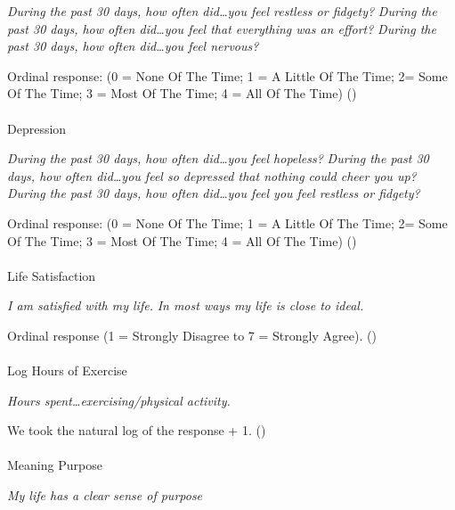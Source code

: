 \documentclass[
  single column]{article}
\makeatletter
\let\oldparagraph\paragraph
\renewcommand{\paragraph}{
    \@ifstar
      \xxxParagraphStar
      \xxxParagraphNoStar
  }
\newcommand{\xxxParagraphStar}[1]{\oldparagraph*{#1}\mbox{}}
\newcommand{\xxxParagraphNoStar}[1]{\oldparagraph{#1}\mbox{}}
\makeatother
\begin{document}
\emph{During the past 30 days, how often did\ldots you feel restless or
fidgety?} \emph{During the past 30 days, how often did\ldots you feel
that everything was an effort?} \emph{During the past 30 days, how often
did\ldots you feel nervous?}

Ordinal response: (0 = None Of The Time; 1 = A Little Of The Time; 2=
Some Of The Time; 3 = Most Of The Time; 4 = All Of The Time)
()

\paragraph{Depression}\label{depression}

\emph{During the past 30 days, how often did\ldots you feel hopeless?}
\emph{During the past 30 days, how often did\ldots you feel so depressed
that nothing could cheer you up?} \emph{During the past 30 days, how
often did\ldots you feel you feel restless or fidgety?}

Ordinal response: (0 = None Of The Time; 1 = A Little Of The Time; 2=
Some Of The Time; 3 = Most Of The Time; 4 = All Of The Time)
()

\paragraph{Life Satisfaction}\label{life-satisfaction}

\emph{I am satisfied with my life.} \emph{In most ways my life is close
to ideal.}

Ordinal response (1 = Strongly Disagree to 7 = Strongly Agree).
()

\paragraph{Log Hours of Exercise}\label{log-hours-of-exercise-1}

\emph{Hours spent\ldots exercising/physical activity.}

We took the natural log of the response + 1.
()

\paragraph{Meaning Purpose}\label{meaning-purpose}

\emph{My life has a clear sense of purpose}
\end{document}
